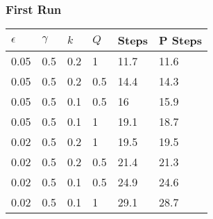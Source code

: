 \documentclass{amsart}
\begin{document}
\subsubsection{First Run}
\begin{center}
	\begin{tabular}{| l | l | l | l || l | l |} \hline
		$\epsilon$	&$\gamma$	&$k$		&$Q$		&Steps	&P Steps \\ \hline
		0.05&	0.5&	0.2&	1&	11.7&	11.6\\ \hline
        		0.05&	0.5&	0.2&	0.5&	14.4&	14.3\\ \hline
        		0.05&	0.5&	0.1&	0.5&	16&	15.9\\ \hline
	       	0.05&	0.5&	0.1&	1&	19.1&	18.7\\ \hline
        		0.02&	0.5&	0.2&	1&	19.5&	19.5\\ \hline
        		0.02&	0.5&	0.2&	0.5&	21.4&	21.3\\ \hline
        		0.02&	0.5&	0.1&	0.5&	24.9&	24.6\\ \hline
        		0.02&	0.5&	0.1&	1&	29.1&	28.7\\ \hline
	\end{tabular}
\end{center}
\end{document}
